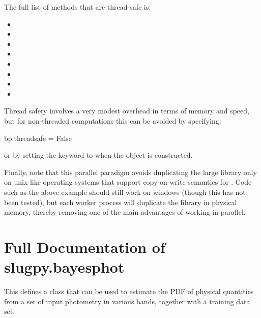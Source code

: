 \documentclass[letterpaper,10pt,english]{sphinxmanual}
\begin{document}
The full list of  methods that are thread-safe is:
\begin{itemize}
\item {} 

\item {} 

\item {} 

\item {} 

\item {} 

\item {} 

\item {} 

\item {} 

\end{itemize}

Thread safety involves a very modest overhead in terms of memory and speed, but for non-threaded computations this can be avoided by specifying:

\begin{sphinxVerbatim}[commandchars=\\\{\}]
bp.thread\PYGZus{}safe = False
\end{sphinxVerbatim}

or by setting the  keyword to  when the 
object is constructed.

Finally, note that this parallel paradigm avoids duplicating the large
library only on unix-like operating systems that support copy-on-write
semantics for . Code such as the
above example should still work on windows (though this has not been
tested), but each worker process will duplicate the library in
physical memory, thereby removing one of the main advantages of
working in parallel.


\section{Full Documentation of slugpy.bayesphot}
\label{\detokenize{bayesphot:module-slugpy.bayesphot.bp}}\label{\detokenize{bayesphot:ssec-slugpy-bayesphot}}\label{\detokenize{bayesphot:full-documentation-of-slugpy-bayesphot}}
This defines a class that can be used to estimate the PDF of physical
quantities from a set of input photometry in various bands, together
with a training data set.
\end{document}
